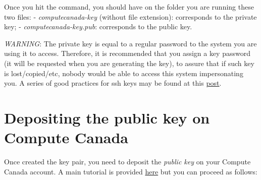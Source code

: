 \documentclass[
]{book}
\begin{document}
Once you hit the command, you should have on the folder you are running these two files:
- \emph{computecanada-key} (without file extension): corresponds to the private key;
- \emph{computecanada-key.pub}: corresponds to the public key.

\emph{WARNING}: The private key is equal to a regular password to the system you are using it to access. Therefore, it is recommended that you assign a key password
(it will be requested when you are generating the key), to assure that if such key is lost/copied/etc, nobody would be able to access this system impersonating you. A series of good practices for ssh keys may be found at this \href{https://security.stackexchange.com/a/144044/275095}{post}.

\hypertarget{depositing-the-public-key-on-compute-canada}{%
\section{Depositing the public key on Compute Canada}\label{depositing-the-public-key-on-compute-canada}}

Once created the key pair, you need to deposit the \emph{public key} on your Compute
Canada account. A main tutorial is provided \href{https://docs.computecanada.ca/wiki/SSH_Keys}{here}
but you can proceed as follows:
\end{document}
